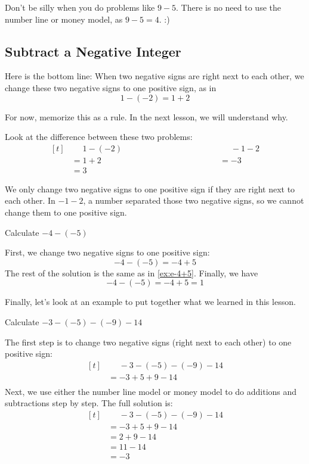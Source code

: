 Don't be silly when you do problems like $9-5$. There is no need to use the number line or money model, as $9-5=4$. :)

\subsection{Subtract a Negative Integer}
Here is the bottom line: When two negative signs are right next to each other, we change these two negative signs to one positive sign, as in
\[ 1-(-2)=1+2 \]

For now, memorize this as a rule. In the next lesson, we will understand why.

Look at the difference between these two problems:
\[
\begin{aligned}[t]
   &\phantom{{}=}1-(-2) &\phantom{aaaaaaaaaaaaaaaaaaa}& \phantom{{}=}-1-2 \\
   &=1+2 &\phantom{aaaaaaaaaaaaaaaaaaa} & =-3 \\
   &=3
\end{aligned}
\]

We only change two negative signs to one positive sign if they are right next to each other. In $-1-2$, a number separated those two negative signs, so we cannot change them to one positive sign.

\begin{myexample}
Calculate $-4-(-5)$
\end{myexample}
\begin{solution}
	First, we change two negative signs to one positive sign:
	\[ -4-(-5)=-4+5 \]
	The rest of the solution is the same as in \cref{ex:e-4+5}.
	Finally, we have \[-4-(-5)=-4+5=1\]
\end{solution}

Finally, let's look at an example to put together what we learned in this lesson.

\begin{myexample}
Calculate $-3-(-5)-(-9)-14$
\begin{solution}
	The first step is to change two negative signs (right next to each other) to one positive sign:
		\[
		\begin{aligned}[t]
			&\phantom{{}=} -3-(-5)-(-9)-14 \\
			& = -3+5+9-14 \\
		\end{aligned}
		\]
	Next, we use either the number line model or money model to do additions and subtractions step by step. The full solution is:
		\[
		\begin{aligned}[t]
			&\phantom{{}=} -3-(-5)-(-9)-14 \\
			& = -3+5+9-14 \\
            & = 2+9-14     \\
            & = 11-14 \\
            &= -3
		\end{aligned}
		\]
\end{solution}
\end{myexample}



